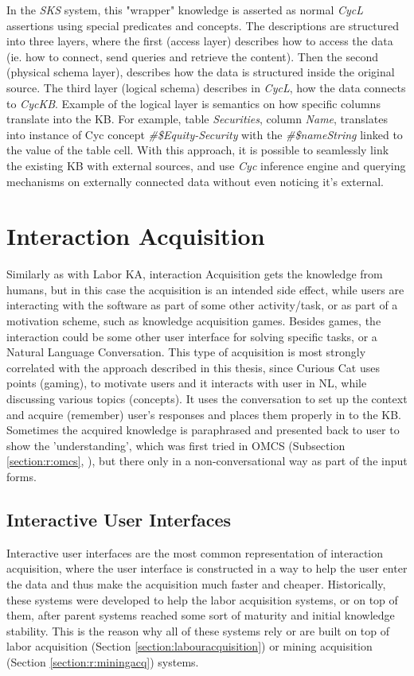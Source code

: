 In the \emph{SKS} system, this "wrapper" knowledge is asserted as normal \emph{CycL}
assertions using special predicates and concepts. The descriptions are 
structured into three layers, where the first (access layer) describes 
how to access the data (ie. how to connect, send queries and retrieve the 
content). Then the second (physical schema layer), describes how the data is
structured inside the original source. The third layer (logical schema) 
describes in \emph{CycL}, how  the data connects to \emph{CycKB}. Example
of the logical layer is semantics on how specific columns translate into the KB.
For example, table \emph{Securities}, column \emph{Name}, translates into
instance of Cyc concept \emph{\#\$Equity-Security} with the 
\emph{\#\$nameString} linked to the value of the table cell.
With this approach, it is possible to seamlessly link the existing KB with
external sources, and use \emph{Cyc} inference engine and querying mechanisms
on externally connected data without even noticing it's external.


\section{Interaction Acquisition}
\label{section:r:interaction}
Similarly as with Labor KA, interaction Acquisition gets the knowledge from 
humans, but in this case the acquisition is an intended side effect, while
users are interacting with the software as part of some other activity/task, or
as part of a motivation scheme, such as knowledge acquisition games. Besides 
games, the interaction could be some other user interface for solving specific
tasks, or a Natural Language Conversation. This type of acquisition is most 
strongly correlated with the approach described in this thesis, since Curious 
Cat uses points (gaming), to motivate users and it interacts with user in NL, 
while discussing various topics (concepts). It uses the conversation to set up
the context and acquire (remember) user's responses and places them properly in
to the KB. Sometimes the acquired knowledge is paraphrased and presented back to
user to show the 'understanding', which was first tried in OMCS 
(Subsection \ref{section:r:omcs}, \textcite{Singh2002b}), but there only in
a non-conversational way as part of the input forms.
 
\subsection{Interactive User Interfaces}
\label{section:r:interactive}
Interactive user interfaces are the most common representation of interaction 
acquisition, where the user interface is constructed in a way to help the user enter
the data and thus make the acquisition much faster and cheaper. Historically, 
these systems were developed to help the labor acquisition systems, or on top
of them, after parent systems reached some sort of maturity and initial 
knowledge stability. This is the reason why all of these systems rely or are 
built on top of labor acquisition (Section \ref{section:labouracquisition}) or 
mining acquisition (Section \ref{section:r:miningacq}) systems.

